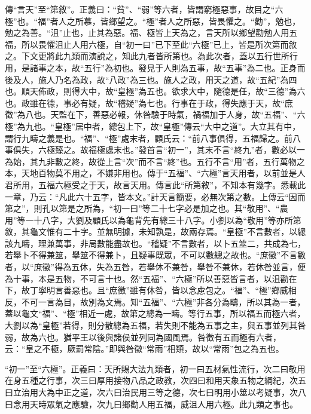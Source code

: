 {\noindent\zhuan{}\fzbyks 傳“言天”至“第敘”。正義曰：“貧”、“弱”等六者，皆謂窮極惡事，故目之“六極”也。“福”者人之所慕，皆鄉望之。“極”者人之所惡，皆畏懼之。“勸”，勉也，勉之為善。“沮”止也，止其為惡。福、極皆上天為之，言天所以鄉望勸勉人用五福，所以畏懼沮止人用六極，自“初一曰”已下至此“六極”已上，皆是所次第而敘之。下文更將此九類而演說之，知此九者皆所第也。為此次者，蓋以五行世所行用，是諸事之本，故“五行”為初也。發見于人則為五事，故“五事”為二也。正身而後及人，施人乃名為政，故“八政”為三也。施人之政，用天之道，故“五紀”為四也。順天佈政，則得大中，故“皇極”為五也。欲求大中，隨德是任，故“三德”為六也。政雖在德，事必有疑，故“稽疑”為七也。行事在于政，得失應于天，故“庶徵”為八也。天監在下，善惡必報，休咎驗于時氣，禍福加于人身，故“五福”、“六極”為九也。“皇極”居中者，總包上下，故“皇極”傳云“大中之道”。大立其有中，謂行九疇之義是也。“福”、“極”處末者，顧氏云：“前八事俱得，五福歸之。前八事俱失，六極臻之。故福極處末也。”發首言“初一”，其末不言“終九”者，數必以一為始，其九非數之終，故從上言“次”而不言“終”也。五行不言“用”者，五行萬物之本，天地百物莫不用之，不嫌非用也。傳于“五福”、“六極”言天用者，以前並是人君所用，五福六極受之于天，故言天用。傳言此“所第敘”，不知本有幾字。悉載此一章，乃云：“凡此六十五字，皆本文。”計天言簡要，必無次第之數。上傳云“因而第之”，則孔以第是之所為，“初一曰”等二十七字必是加之也。其“敬用”、“農用”等一十八字，大劉及顧氏以為龜背先有總三十八字。小劉以為“敬用”等亦所第敘，其龜文惟有二十字。並無明據，未知孰是，故兩存焉。“皇極”不言數者，以總該九疇，理兼萬事，非局數能盡故也。“稽疑”不言數者，以卜五筮二，共成為七，若舉卜不得兼筮，舉筮不得兼卜，且疑事既眾，不可以數總之故也。“庶徵”不言數者，以“庶徵”得為五休，失為五咎，若舉休不兼咎，舉咎不兼休，若休咎並言，便為十事，本是五物，不可言十也。然“五福”、“六極”所以善惡皆言者，以沮勸在下，故丁寧明言善惡也。且“庶徵”雖有休咎，皆以念慮包之。“福”、“極”鄉威相反，不可一言為目，故別為文焉。知“五福”、“六極”非各分為疇，所以其為一者，蓋以龜文“福”、“極”相近一處，故第之總為一疇。等行五事，所以福五而極六者，大劉以為“皇極”若得，則分散總為五福，若失則不能為五事之主，與五事並列其咎弱，故為六也。猶平王以後與諸侯並列同為國風焉。咎徵有五而極有六者，云：“皇之不極，厥罰常陰。”即與咎徵“常雨”相類，故以“常雨”包之為五也。 \par}

{\noindent\shu{}\fzkt “初一”至“六極”。正義曰：天所賜大法九類者，初一曰五材氣性流行，次二曰敬用在身五種之行事，次三曰厚用接物八品之政教，次四曰和用天象五物之綱紀，次五曰立治用大為中正之道，次六曰治民用三等之德，次七曰明用小筮以考疑事，次八曰念用天時眾氣之應驗，次九曰鄉勸人用五福，威沮人用六極。此九類之事也。 \par}

